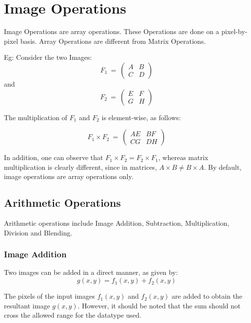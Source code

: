 \chapter{Image Operations}

Image Operations are array operations.
These Operations are done on a pixel-by-pixel basis.
Array Operations are different from Matrix Operations.

Eg: Consider the two Images:
\begin{equation*}
    F_{1} \ =\ \begin{pmatrix}
    A & B\\
    C & D
    \end{pmatrix}
\end{equation*}
and
\begin{equation*}
    F_{2} \ =\ \begin{pmatrix}
    E & F\\
    G & H
    \end{pmatrix}
\end{equation*}

The multiplication of $F_1$ and $F_2$ is element-wise, as follows:

\begin{equation*}
    F_{1} \times F_{2}\ =\ \begin{pmatrix}
    AE & BF\\
    CG & DH
    \end{pmatrix}
\end{equation*}

In addition, one can observe that $F_1 \times F_2 = F_2 \times F_1$, whereas matrix multiplication is clearly different, since in matrices, $A \times B \neq B \times A$.
By default, image operations are array operations only.

\section{Arithmetic Operations}

Arithmetic operations include Image Addition, Subtraction, Multiplication, Division and Blending.

\subsection{Image Addition}

Two images can be added in a direct manner, as given by:
$$g(x,y) = f_1(x,y) + f_2(x,y)$$

The pixels of the input images $f_1(x,y)$ and $f_2(x,y)$ are added to obtain the resultant image $g(x,y)$.
However, it should be noted that the sum should not cross the allowed range for the datatype used.


